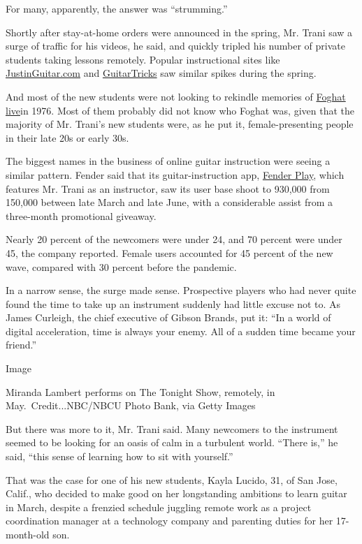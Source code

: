 For many, apparently, the answer was ``strumming.''

Shortly after stay-at-home orders were announced in the spring, Mr.
Trani saw a surge of traffic for his videos, he said, and quickly
tripled his number of private students taking lessons remotely. Popular
instructional sites like
\href{https://www.justinguitar.com/}{JustinGuitar.com} and
\href{https://www.guitartricks.com/}{GuitarTricks} saw similar spikes
during the spring.

And most of the new students were not looking to rekindle memories of
\href{https://www.youtube.com/watch?v=As5_xq78VRA}{Foghat live}in 1976.
Most of them probably did not know who Foghat was, given that the
majority of Mr. Trani's new students were, as he put it,
female-presenting people in their late 20s or early 30s.

The biggest names in the business of online guitar instruction were
seeing a similar pattern. Fender said that its guitar-instruction app,
\href{https://www.fender.com/play}{Fender Play}, which features Mr.
Trani as an instructor, saw its user base shoot to 930,000 from 150,000
between late March and late June, with a considerable assist from a
three-month promotional giveaway.

Nearly 20 percent of the newcomers were under 24, and 70 percent were
under 45, the company reported. Female users accounted for 45 percent of
the new wave, compared with 30 percent before the pandemic.

In a narrow sense, the surge made sense. Prospective players who had
never quite found the time to take up an instrument suddenly had little
excuse not to. As James Curleigh, the chief executive of Gibson Brands,
put it: ``In a world of digital acceleration, time is always your enemy.
All of a sudden time became your friend.''

Image

Miranda Lambert performs on The Tonight Show, remotely, in
May.~Credit...NBC/NBCU Photo Bank, via Getty Images

But there was more to it, Mr. Trani said. Many newcomers to the
instrument seemed to be looking for an oasis of calm in a turbulent
world. ``There is,'' he said, ``this sense of learning how to sit with
yourself.''

That was the case for one of his new students, Kayla Lucido, 31, of San
Jose, Calif., who decided to make good on her longstanding ambitions to
learn guitar in March, despite a frenzied schedule juggling remote work
as a project coordination manager at a technology company and parenting
duties for her 17-month-old son.

